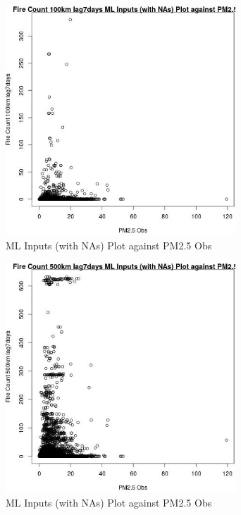 \begin{figure} 
\centering  
\includegraphics[width=0.77\textwidth]{Code_Outputs/Report_ML_input_PM25_Step4_part_e_de_duplicated_aves_compiled_2019-05-18wNAs_Fire_Count_100km_lag7daysvPM25_Obs.jpg} 
\caption{\label{fig:Report_ML_input_PM25_Step4_part_e_de_duplicated_aves_compiled_2019-05-18wNAsFire_Count_100km_lag7daysvPM25_Obs}ML Inputs (with NAs) Plot against PM2.5 Obs} 
\end{figure} 
 

\begin{figure} 
\centering  
\includegraphics[width=0.77\textwidth]{Code_Outputs/Report_ML_input_PM25_Step4_part_e_de_duplicated_aves_compiled_2019-05-18wNAs_Fire_Count_500km_lag7daysvPM25_Obs.jpg} 
\caption{\label{fig:Report_ML_input_PM25_Step4_part_e_de_duplicated_aves_compiled_2019-05-18wNAsFire_Count_500km_lag7daysvPM25_Obs}ML Inputs (with NAs) Plot against PM2.5 Obs} 
\end{figure} 
 

